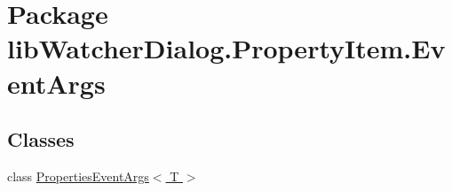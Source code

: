 \hypertarget{namespacelib_watcher_dialog_1_1_property_item_1_1_event_args}{\section{Package lib\+Watcher\+Dialog.\+Property\+Item.\+Event\+Args}
\label{namespacelib_watcher_dialog_1_1_property_item_1_1_event_args}
}
\subsection*{Classes}
\begin{DoxyCompactItemize}
\item 
class \hyperlink{classlib_watcher_dialog_1_1_property_item_1_1_event_args_1_1_properties_event_args_3_01_t_01_4}{Properties\+Event\+Args$<$ T $>$}
\end{DoxyCompactItemize}
